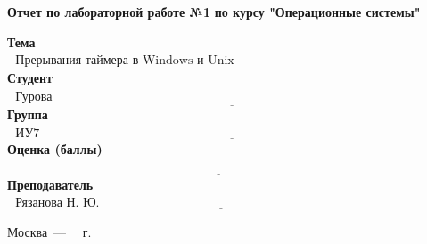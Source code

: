 \begin{titlepage}
	
	\begin{center}
		\Large\textbf{Отчет по лабораторной работе №1}
		\Large\textbf {по курсу "Операционные системы"}
	\end{center}

	
	\noindent\textbf{Тема} $\underline{\text{~~Прерывания таймера в Windows и Unix ~~~~~~~~~~~~~~~~~~~~~~~~~~~~~~~~~~~~~~~~~~~~~~~~~~~~~~~~~~~~~}}$\newline\newline\newline
	\noindent\textbf{Студент} $\underline{\text{~~Гурова Н.А.~~~~~~~~~~~~~~~~~~~~~~~~~~~~~~~~~~~~~~~~~~~~~~~~~~~~~~~~~~~~~~~~~~~~~~~~~~~~~~~~~~~~~~~~~~~~~~~}}$\newline\newline
	\noindent\textbf{Группа} $\underline{\text{~~ИУ7-54Б~~~~~~~~~~~~~~~~~~~~~~~~~~~~~~~~~~~~~~~~~~~~~~~~~~~~~~~~~~~~~~~~~~~~~~~~~~~~~~~~~~~~~~~~~~~~~~~~~~~~~~}}$\newline\newline
	\noindent\textbf{Оценка (баллы)} $\underline{\text{~~~~~~~~~~~~~~~~~~~~~~~~~~~~~~~~~~~~~~~~~~~~~~~~~~~~~~~~~~~~~~~~~~~~~~~~~~~~~~~~~~~~~~~~~~~~~~~~~~~~~~}}$\newline\newline
	\noindent\textbf{Преподаватель} $\underline{\text{~~Рязанова Н. Ю.~~~~~~~~~~~~~~~~~~~~~~~~~~~~~~~~~~~~~~~~~~~~~~~~~~~~~~~~~~~~~~~~~~~~~~~~~~~~~~~~~}}$\newline
	
	\begin{center}
		\vfill
		Москва~---~\the\year
		~г.
	\end{center}
	\restoregeometry
\end{titlepage}
